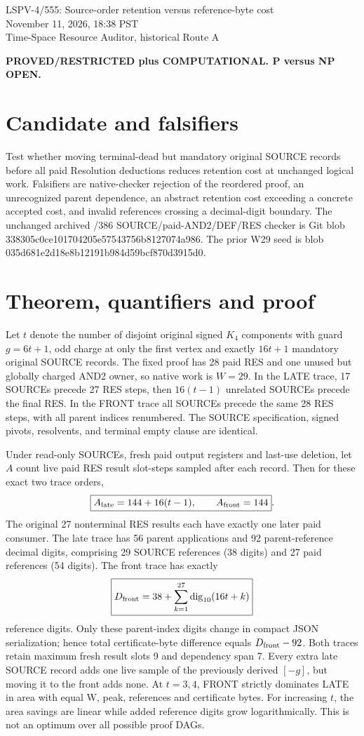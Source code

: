 \documentclass[11pt]{article}
\begin{document}
\begin{center}
{\Large LSPV-4/555: Source-order retention versus reference-byte cost}\\
November 11, 2026, 18:38 PST\\
Time-Space Resource Auditor, historical Route A
\end{center}
\noindent\textbf{PROVED/RESTRICTED plus COMPUTATIONAL. P versus NP OPEN.}
\section*{Candidate and falsifiers}
Test whether moving terminal-dead but mandatory original SOURCE records before all paid Resolution deductions reduces retention cost at unchanged logical work. Falsifiers are native-checker rejection of the reordered proof, an unrecognized parent dependence, an abstract retention cost exceeding a concrete accepted cost, and invalid references crossing a decimal-digit boundary. The unchanged archived /386 SOURCE/paid-AND2/DEF/RES checker is Git blob 338305c0ce101704205e57543756b8127074a986. The prior W29 seed is blob 035d681e2d18e8b12191b984d59bcf870d3915d0.
\section*{Theorem, quantifiers and proof}
Let $t$ denote the number of disjoint original signed $K_4$ components with guard $g=6t+1$, odd charge at only the first vertex and exactly $16t+1$ mandatory original SOURCE records. The fixed proof has 28 paid RES and one unused but globally charged AND2 owner, so native work is $W=29$. In the LATE trace, 17 SOURCEs precede 27 RES steps, then $16(t-1)$ unrelated SOURCEs precede the final RES. In the FRONT trace all SOURCEs precede the same 28 RES steps, with all parent indices renumbered. The SOURCE specification, signed pivots, resolvents, and terminal empty clause are identical.

Under read-only SOURCEs, fresh paid output registers and last-use deletion, let $A$ count live paid RES result slot-steps sampled after each record. Then for these exact two trace orders,
\[
\boxed{A_{\rm late}=144+16(t-1),\qquad A_{\rm front}=144}.
\]
The original 27 nonterminal RES results each have exactly one later paid consumer. The late trace has 56 parent applications and 92 parent-reference decimal digits, comprising 29 SOURCE references (38 digits) and 27 paid references (54 digits). The front trace has exactly
\[
\boxed{D_{\rm front}=38+\sum_{k=1}^{27}\operatorname{dig}_{10}(16t+k)}
\]
reference digits. Only these parent-index digits change in compact JSON serialization; hence total certificate-byte difference equals $D_{\rm front}-92$. Both traces retain maximum fresh result slots 9 and dependency span 7. Every extra late SOURCE record adds one live sample of the previously derived $[-g]$, but moving it to the front adds none. At $t=3,4$, FRONT strictly dominates LATE in area with equal W, peak, references and certificate bytes. For increasing $t$, the area savings are linear while added reference digits grow logarithmically. This is not an optimum over all possible proof DAGs.
\end{document}

